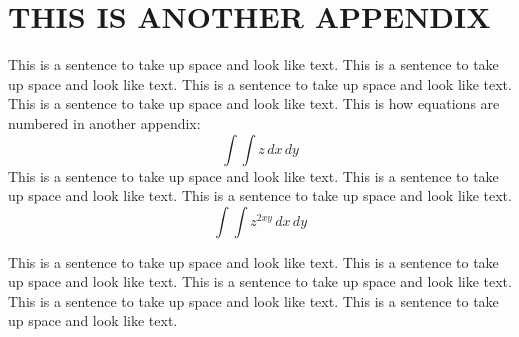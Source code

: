  
\section{THIS IS ANOTHER APPENDIX}
This is a sentence to take up space and look like text.
This is a sentence to take up space and look like text.
This is a sentence to take up space and look like text.
This is a sentence to take up space and look like text.
This is how equations are numbered in another appendix:
\begin{equation}
\int\!\!\int z\,dx\,dy
\end{equation} 
This is a sentence to take up space and look like text.
This is a sentence to take up space and look like text.
This is a sentence to take up space and look like text.
\begin{equation}
\int\!\!\int z^{2xy}\,dx\,dy
\end{equation} 

This is a sentence to take up space and look like text.
This is a sentence to take up space and look like text.
This is a sentence to take up space and look like text.
This is a sentence to take up space and look like text.
This is a sentence to take up space and look like text. 
